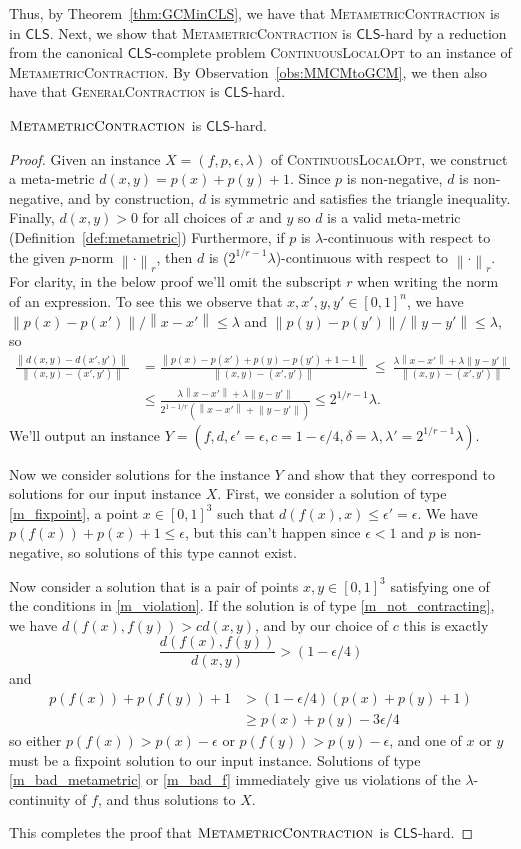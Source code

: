 \documentclass[a4paper,UKenglish]{lipics2}
\theoremstyle{definition}
\def\cc#1{\mathsf{#1}}
\def\CLS{\ensuremath{\cc{CLS}}\xspace}
\def\problem#1{\textsc{#1}}
\def\GCM{\problem{GeneralContraction}\xspace}
\def\MMCM{\problem{MetametricContraction}\xspace}
\def\CLO{\problem{ContinuousLocalOpt}\xspace}
\def\e{\epsilon}
\def\Norm#1{\left\| #1 \right\|}
\begin{document}
Thus, by Theorem~\ref{thm:GCMinCLS}, we have that \MMCM is in \CLS.
%
Next, we show that \MMCM is \CLS-hard by a reduction 
from the canonical \CLS-complete problem \CLO to an instance of \MMCM.
By Observation~\ref{obs:MMCMtoGCM}, we then also have that \GCM is \CLS-hard.

\begin{theorem}
\label{thm:MMCMisCLShard}
  $\MMCM$ is $\CLS$-hard.
\end{theorem}
\begin{proof}
  Given an instance $X = (f,p,\e,\lambda)$ of \CLO, we construct a meta-metric $d(x,y) = p(x) + p(y) + 1$. 
	Since $p$ is non-negative, $d$ is non-negative, and by construction, $d$ is symmetric and satisfies the triangle inequality. Finally, $d(x,y) > 0$ for all choices of $x$ and $y$ so $d$ is a valid meta-metric (Definition~\ref{def:metametric}) Furthermore, if $p$ is $\lambda$-continuous with respect to the given $p$-norm $\Norm{\cdot}_r$, then $d$ is ($2^{1/r-1}\lambda$)-continuous with respect to $\Norm{\cdot}_r$. For clarity, in the below proof we'll omit the subscript $r$ when writing the norm of an expression. To see this we observe that $x,x',y,y'\in [0,1]^n$, we have $\Norm{p(x)-p(x')}/\Norm{x-x'} \leq \lambda$ and $\Norm{p(y) - p(y')}/\Norm{y-y'} \leq \lambda$, so
  \begin{align*}
    \frac{\Norm{d(x,y) - d(x',y')}}{\Norm{(x,y) - (x',y')}}
    &= \frac{\Norm{p(x) - p(x') + p(y) - p(y') + 1 - 1}}{\Norm{(x,y) -(x',y')}}\ \leq\ \frac{\lambda\Norm{x-x'} + \lambda\Norm{y-y'}}{\Norm{(x,y) -(x',y')}}\\
    &\leq \frac{\lambda\Norm{x-x'} + \lambda\Norm{y-y'}}{2^{1-1/r}(\Norm{x-x'} + \Norm{y-y'})} \leq 2^{1/r-1}\lambda \text{.}
  \end{align*}
We'll output an instance $Y = (f,d,\e'=\e,c = 1-\e/4,\delta=\lambda, \lambda'=2^{1/r-1}\lambda)$.

Now we consider solutions for the instance $Y$ and show that they correspond to solutions for our input instance $X$.
%
First, we consider a solution of type \ref{m_fixpoint}, a point $x\in [0,1]^3$ such that $d(f(x),x) \leq \e'=\e$. We have $p(f(x)) + p(x) + 1 \leq \e$, but this can't happen since $\e < 1$ and $p$ is non-negative, so solutions of this type cannot exist.

Now consider a solution that is a pair of points $x,y\in [0,1]^3$ satisfying one of the conditions in \ref{m_violation}. If the solution is of type \ref{m_not_contracting}, we have $d(f(x),f(y)) > c d(x,y)$, and by our choice of $c$ this is exactly
\[\frac{d(f(x),f(y))}{d(x,y)} > (1-\e/4)\] and
\begin{align*}
  p(f(x)) + p(f(y)) + 1 &> (1-\e/4) (p(x) + p(y) + 1)\\
                        &\geq p(x) + p(y) - 3\e/4
\end{align*}
so either $p(f(x)) > p(x) - \e$ or $p(f(y)) > p(y) - \e$, and one of $x$ or $y$ must be a fixpoint solution to our input instance.
%
Solutions of type \ref{m_bad_metametric} or \ref{m_bad_f} immediately give us violations of the $\lambda$-continuity of $f$, and thus solutions to $X$.

This completes the proof that $\MMCM$ is $\CLS$-hard.
\end{proof}
\end{document}
